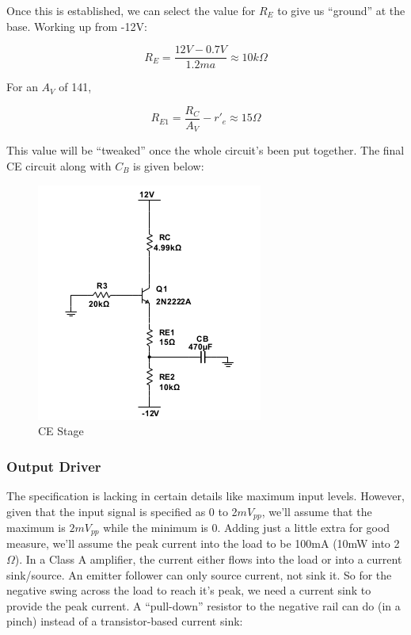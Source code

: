 \documentclass[journal]{IEEEtran}
\begin{document}
Once this is established, we can select the value for $R_{E}$ to give us “ground” at the base. Working
up from -12V:

\begin{equation}
R_{E} = \frac{12V - 0.7V}{1.2ma} \approx 10k\Omega
\end{equation}

For an $A_{V}$ of 141,

\begin{equation}
R_{E1} = \frac{R_{C}}{A_{V}} - r'_{e} \approx 15\Omega
\end{equation}

This value will be “tweaked” once the whole circuit’s been put together. The final CE circuit along with
$C_{B}$ is given below:

\begin{figure}[H]
\centering
\includegraphics[scale=.6]{CE-stage.png}
\caption{CE Stage}
\label{fig_ce_stage}
\end{figure}

\subsubsection{Output Driver}

The specification is lacking in certain details like maximum input levels. However, given that the input
signal is specified as 0 to 2$mV_{pp}$, we’ll assume that the maximum is $2mV_{pp}$ while the minimum is
0. Adding just a little extra for good measure, we’ll assume the peak current into the load to be
100mA (10mW into 2$\Omega$). In a Class A amplifier, the current either flows into the load or into a
current sink/source. An emitter follower can only source current, not sink it. So for the negative
swing across the load to reach it’s peak, we need a current sink to provide the peak current. A
“pull-down” resistor to the negative rail can do (in a pinch) instead of a transistor-based current
sink:
\end{document}
